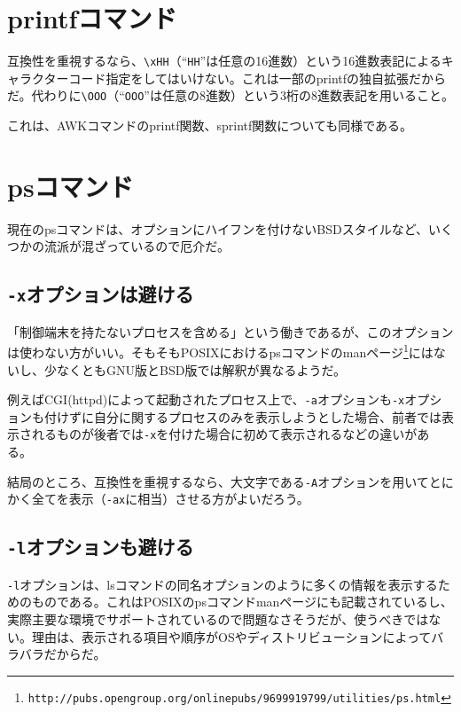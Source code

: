 \section{printfコマンド}
\label{allenvs:printf}

互換性を重視するなら、\verb|\xHH|（``\verb|HH|''は任意の16進数）という16進数表記によるキャラクターコード指定をしてはいけない。これは一部のprintfの独自拡張だからだ。代わりに\verb|\OOO|（``\verb|OOO|''は任意の8進数）という3桁の8進数表記を用いること。

これは、AWKコマンドのprintf関数、sprintf関数についても同様である。

\section{psコマンド}

現在のpsコマンドは、オプションにハイフンを付けないBSDスタイルなど、いくつかの流派が混ざっているので厄介だ。

\subsection*{\verb|-x|オプションは避ける}

「制御端末を持たないプロセスを含める」という働きであるが、このオプションは使わない方がいい。そもそもPOSIXにおけるpsコマンドのmanページ\footnote{\verb|http://pubs.opengroup.org/onlinepubs/9699919799/utilities/ps.html|}にはないし、少なくともGNU版とBSD版では解釈が異なるようだ。

例えばCGI(httpd)によって起動されたプロセス上で、\verb|-a|オプションも\verb|-x|オプションも付けずに自分に関するプロセスのみを表示しようとした場合、前者では表示されるものが後者では\verb|-x|を付けた場合に初めて表示されるなどの違いがある。

結局のところ、互換性を重視するなら、大文字である\verb|-A|オプションを用いてとにかく全てを表示（\verb|-ax|に相当）させる方がよいだろう。

\subsection*{\verb|-l|オプションも避ける}

\verb|-l|オプションは、lsコマンドの同名オプションのように多くの情報を表示するためのものである。これはPOSIXのpsコマンドmanページにも記載されているし、実際主要な環境でサポートされているので問題なさそうだが、使うべきではない。理由は、表示される項目や順序がOSやディストリビューションによってバラバラだからだ。

